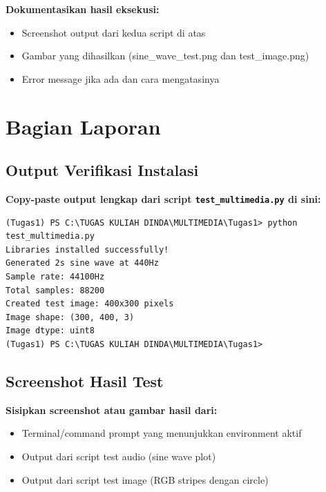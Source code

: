 \documentclass[11pt,a4paper]{article}
\begin{document}
\textbf{Dokumentasikan hasil eksekusi:}
\begin{itemize}
    \item Screenshot output dari kedua script di atas
    \item Gambar yang dihasilkan (sine\_wave\_test.png dan test\_image.png)
    \item Error message jika ada dan cara mengatasinya
\end{itemize}

\section{Bagian Laporan}

\subsection{Output Verifikasi Instalasi}
\textbf{Copy-paste output lengkap dari script \texttt{test\_multimedia.py} di sini:}

\begin{lstlisting}[caption=Output verifikasi instalasi]
(Tugas1) PS C:\TUGAS KULIAH DINDA\MULTIMEDIA\Tugas1> python test_multimedia.py
Libraries installed successfully!
Generated 2s sine wave at 440Hz
Sample rate: 44100Hz
Total samples: 88200
Created test image: 400x300 pixels
Image shape: (300, 400, 3)
Image dtype: uint8
(Tugas1) PS C:\TUGAS KULIAH DINDA\MULTIMEDIA\Tugas1>
\end{lstlisting}

\subsection{Screenshot Hasil Test}
\textbf{Sisipkan screenshot atau gambar hasil dari:}
\begin{itemize}
    \item Terminal/command prompt yang menunjukkan environment aktif
    \item Output dari script test audio (sine wave plot)
    \item Output dari script test image (RGB stripes dengan circle)
\end{itemize}
\end{document}
